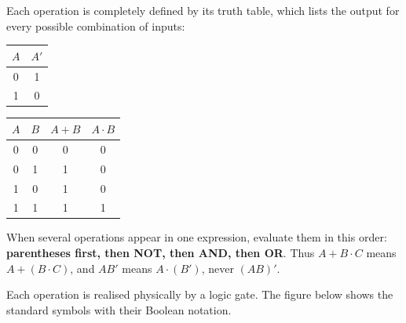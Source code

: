 \documentclass[11pt]{article}
\newcommand{\cle}[1]{{\popxbold\color{popdark}#1}}
\begin{document}
Each operation is completely defined by its \cle{truth table}, which lists the output for every possible combination of inputs:

\begin{center}
\begin{tabular}{|c|c|}
\hline
\rowcolor{popblueL} $A$ & $A'$ \\
\hline
0 & 1 \\
\hline
1 & 0 \\
\hline
\end{tabular}
\qquad
\begin{tabular}{|cc|c|c|}
\hline
\rowcolor{popblueL} $A$ & $B$ & $A+B$ & $A\cdot B$ \\
\hline
0 & 0 & 0 & 0 \\
\hline
0 & 1 & 1 & 0 \\
\hline
1 & 0 & 1 & 0 \\
\hline
1 & 1 & 1 & 1 \\
\hline
\end{tabular}
\end{center}

\begin{aretenir}
When several operations appear in one expression, evaluate them in this order: \textbf{parentheses first, then NOT, then AND, then OR}. Thus $A + B\cdot C$ means $A + (B\cdot C)$, and $AB'$ means $A\cdot(B')$, never $(AB)'$.
\end{aretenir}

Each operation is realised physically by a \cle{logic gate}. The figure below shows the standard symbols with their Boolean notation.
\end{document}

